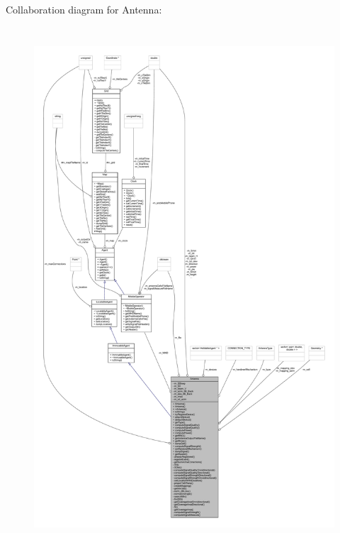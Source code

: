 Collaboration diagram for Antenna\+:
\nopagebreak
\begin{figure}[H]
\begin{center}
\leavevmode
\includegraphics[height=550pt]{class_antenna__coll__graph}
\end{center}
\end{figure}
